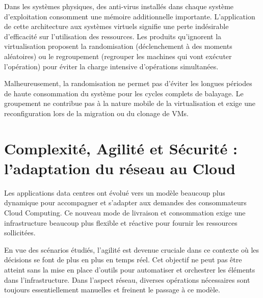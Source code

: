 Dans les systèmes physiques, des anti-virus installés dans chaque système d'exploitation consomment une mémoire additionnelle importante. L'application de cette architecture aux systèmes virtuels signifie une perte indésirable d'efficacité sur l'utilisation des ressources. Les produits qu'ignorent la virtualisation proposent la randomisation (déclenchement à des moments aléatoires)  ou le regroupement (regrouper les machines qui vont exécuter l'opération) pour éviter la charge intensive d'opérations simultanées.

Malheureusement, la randomisation ne permet pas d'éviter les longues périodes de haute consommation du système pour les cycles complets de balayage. Le groupement ne contribue pas à la nature mobile de la virtualisation et exige une reconfiguration lors de la migration ou du clonage de VMs. 
\cite{hpAlcatelCreatinCloudDCchallenges} \cite{cloudSecurityThreats}


\section{Complexité, Agilité et Sécurité : l'adaptation du réseau au Cloud}

Les applications data centres ont évolué vers un modèle beaucoup plus dynamique pour accompagner et s'adapter aux demandes des consommateurs Cloud Computing. Ce nouveau mode de livraison et consommation exige une infrastructure beaucoup plus flexible et réactive pour fournir les ressources sollicitées. 

En vue des scénarios étudiés, l'agilité est devenue cruciale dans ce contexte où les décisions se font de plus en plus en temps réel. Cet objectif ne peut pas être atteint sans la mise en place d'outils pour automatiser et orchestrer les éléments dans l'infrastructure. Dans l'aspect réseau, diverses opérations nécessaires sont toujours essentiellement manuelles et freinent le passage à ce modèle.

